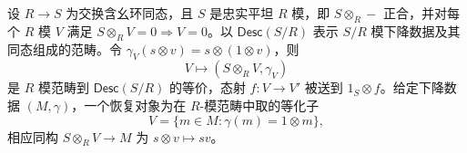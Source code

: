 \begin{theorem}[忠实平坦模下降]\label{b4:thm:A-faithfully-flat-descent}
	设 \(R\to S\) 为交换含幺环同态，且 \(S\) 是忠实平坦 \(R\) 模，即 \(S\otimes_R-\) 正合，并对每个 \(R\) 模 \(V\) 满足 \(S\otimes_RV=0\Rightarrow V=0\)。以 \(\mathsf{Desc}(S/R)\) 表示 \(S/R\) 模下降数据及其同态组成的范畴。令 \(\gamma_V(s\otimes v)=s\otimes(1\otimes v)\)，则
	\[
		V\longmapsto(S\otimes_RV,\gamma_V)
	\]
	是 \(R\) 模范畴到 \(\mathsf{Desc}(S/R)\) 的等价，态射 \(f:V\to V'\) 被送到 \(1_S\otimes f\)。给定下降数据 \((M,\gamma)\)，一个恢复对象为在 \(R\)-模范畴中取的等化子
	\begin{equation}\label{b4:eq:A-descent-equalizer}
		V=\bigl\{m\in M:\gamma(m)=1\otimes m\bigr\},
	\end{equation}
	相应同构 \(S\otimes_RV\to M\) 为 \(s\otimes v\mapsto sv\)。
\end{theorem}
